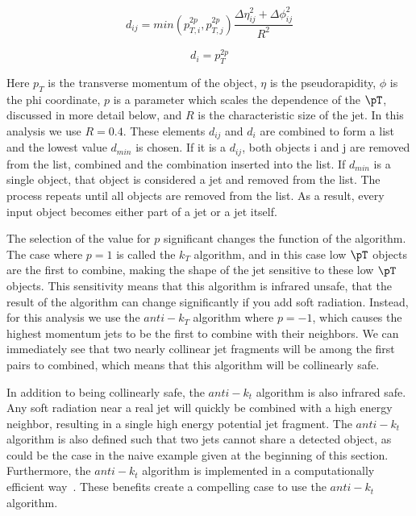 \begin{equation}
d_{ij} = min(p^{2p}_{T,i},p^{2p}_{T,j})\frac{\Delta\eta^{2}_{ij}+\Delta\phi^{2}_{ij}}{R^{2}}
\end{equation}

\begin{equation}
d_{i} = p^{2p}_{T}
\end{equation}

\noindent
Here $p_T$ is the transverse momentum of the object, $\eta$ is the pseudorapidity, $\phi$ is the phi coordinate, $p$ is a parameter which scales the dependence of the $\pT$, discussed in more detail below, and $R$ is the characteristic size of the jet. In this analysis we use $R=0.4$. These elements $d_{ij}$ and $d_{i}$ are combined to form a list and the lowest value $d_{min}$ is chosen. If it is a $d_{ij}$, both objects i and j are removed from the list, combined and the combination inserted into the list. If $d_{min}$ is a single object, that object is considered a jet and removed from the list. The process repeats until all objects are removed from the list. As a result, every input object becomes either part of a jet or a jet itself. 

The selection of the value for $p$ significant changes the function of the algorithm. The case where $p = 1$ is called the $k_T$ algorithm, and in this case low $\pT$ objects are the first to combine, making the shape of the jet sensitive to these low $\pT$ objects. This sensitivity means that this algorithm is infrared unsafe, that the result of the algorithm can change significantly if you add soft radiation. Instead, for this analysis we use the $anti-k_T$ algorithm where $p = -1$, which causes the highest momentum jets to be the first to combine with their neighbors. We can immediately see that two nearly collinear jet fragments will be among the first pairs to combined, which means that this algorithm will be collinearly safe. 

In addition to being collinearly safe, the $anti-k_t$ algorithm is also infrared safe. Any soft radiation near a real jet will quickly be combined with a high energy neighbor, resulting in a single high energy potential jet fragment. The $anti-k_t$ algorithm is also defined such that two jets cannot share a detected object, as could be the case in the naive example given at the beginning of this section. Furthermore, the $anti-k_t$ algorithm is implemented in a computationally efficient way~\cite{AntiKtComputing}. These benefits create a compelling case to use the $anti-k_t$ algorithm.

